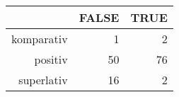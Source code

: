 \begin{tabular}{rrr}
  \hline
 & FALSE & TRUE \\ 
  \hline
komparativ & 1 & 2 \\ 
  positiv & 50 & 76 \\ 
  superlativ & 16 & 2 \\ 
   \hline
\end{tabular}
